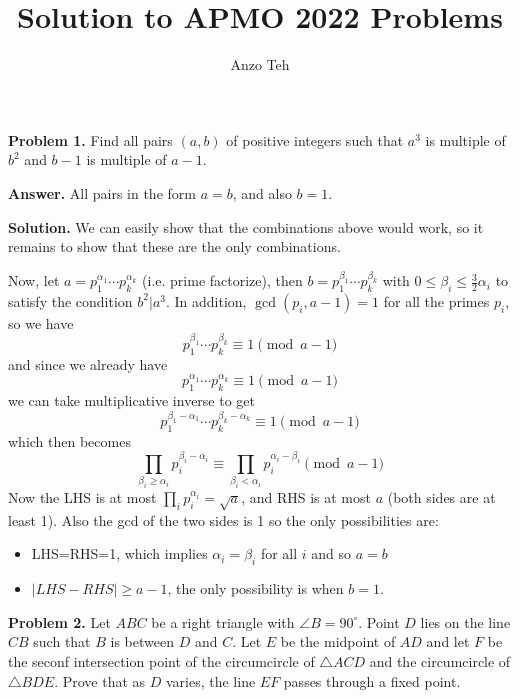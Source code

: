 \documentclass[11pt,a4paper]{article}
\begin{document}
	\newcommand{\la}{\leftarrow}
	\newcommand{\lra}{\leftrightarrow}
	\newcommand{\bbN}{\mathbb{N}}
	\newcommand{\bbZ}{\mathbb{Z}}
	\newcommand{\dsum}{\displaystyle\sum}
	\newcommand{\dprod}{\displaystyle\prod}
	
	
	\title{Solution to APMO 2022 Problems}
	\author{Anzo Teh}
	\date{}
	\maketitle
	
	\textbf{Problem 1.} 
		Find all pairs $(a,b)$ of positive integers such that $a^3$ is multiple of $b^2$ and $b-1$ is multiple of $a-1$.
		
		\textbf{Answer.} 
		All pairs in the form $a=b$, and also $b=1$. 
		
		\textbf{Solution.} We can easily show that the combinations above would work, 
		so it remains to show that these are the only combinations. 
		
		Now, let $a=p_1^{\alpha_1}\cdots p_k^{\alpha_k}$ (i.e. prime factorize), 
		then $b=p_1^{\beta_1}\cdots p_k^{\beta_k}$ with $0\le \beta_i\le \frac 32\alpha_i$ to satisfy the condition $b^2|a^3$. 
		In addition, $\gcd(p_i, a-1)=1$ for all the primes $p_i$, so we have 
		\[
		p_1^{\beta_1}\cdots p_k^{\beta_k}\equiv 1\pmod{a-1}
		\]
		and since we already have 
		\[
		p_1^{\alpha_1}\cdots p_k^{\alpha_k}\equiv 1\pmod{a-1}
		\]
		we can take multiplicative inverse to get 
		\[
		p_1^{\beta_1-\alpha_1}\cdots p_k^{\beta_k-\alpha_k}\equiv 1\pmod{a-1}
		\]
		which then becomes 
		\[
		\prod_{\beta_i\ge\alpha_i}p_i^{\beta_i-\alpha_i}
		\equiv \prod_{\beta_i<\alpha_i}p_i^{\alpha_i-\beta_i}\pmod{a-1}
		\]
		Now the LHS is at most $\prod_{i}p_i^{\alpha_i}=\sqrt{a}$, 
		and RHS is at most $a$ (both sides are at least 1). Also the gcd of the two sides is 1 so the only possibilities are: 
		\begin{itemize}
			\item LHS=RHS=1, which implies $\alpha_i=\beta_i$ for all $i$ and so $a=b$
			
			\item $|LHS-RHS|\ge a-1$, the only possibility is when $b=1$. 
		\end{itemize}
	    
	    \textbf{Problem 2.}
	    Let $ABC$ be a right triangle with $\angle B=90^{\circ}$. Point $D$ lies on the line $CB$ such that $B$ is between $D$ and $C$. Let $E$ be the midpoint of $AD$ and let $F$ be the seconf intersection point of the circumcircle of $\triangle ACD$ and the circumcircle of $\triangle BDE$. Prove that as $D$ varies, the line $EF$ passes through a fixed point.
	    
\end{document}
